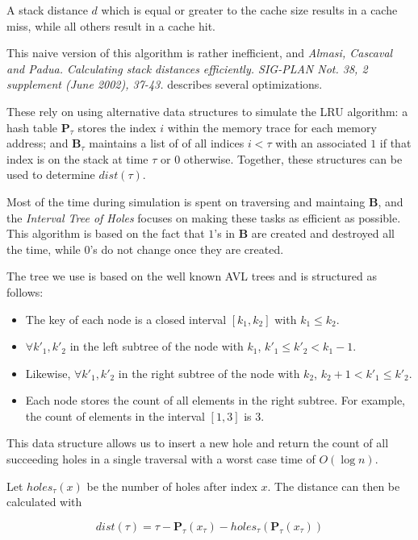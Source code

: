 \documentclass[a4paper,10pt]{article}
\begin{document}
A stack distance $d$ which is equal or greater to the cache size results
in a cache miss, while all others result in a cache hit.

This naive version of this algorithm is rather inefficient, and \emph{Almasi, Cascaval and Padua. Calculating stack distances efficiently. SIG-PLAN Not. 38, 2 supplement (June 2002), 37-43.} describes several optimizations.

These rely on using alternative data structures to simulate the LRU algorithm: a hash table $\mathbf{P}_\tau$ stores the index $i$ within the memory trace for each memory address; and $\mathbf{B}_\tau$ maintains a list of
of all indices $i < \tau$ with an associated $1$ if that index is on the stack at time $\tau$ or $0$ otherwise. Together, these structures can
be used to  determine $dist(\tau)$.

Most of the time during simulation is spent on traversing and maintaing $\mathbf{B}$, and the \emph{Interval Tree of Holes} focuses on making these tasks as efficient as possible. This algorithm is based on the fact that
$1$'s in $\mathbf{B}$ are created and destroyed all the time, while $0$'s
do not change once they are created.

The tree we use is based on the well known AVL trees and is structured
as follows:

\begin{itemize}
\item The key of each node is a closed interval $[k_1, k_2]$ with
      $k_1 \leq k_2$.
\item $\forall k'_1, k'_2$ in the left subtree of the node with $k_1$,          $k'_1 \leq k'_2 < k_1 - 1$.
\item Likewise, $\forall k'_1, k'_2$ in the right subtree of the node with $k_2$, $k_2 + 1 < k'_1 \leq k'_2$.
\item Each node stores the count of all elements
      in the right subtree. For example, the count of elements in the
      interval $[1, 3]$ is $3$.
\end{itemize}

This data structure allows us to insert a new hole and return the count
of all succeeding holes in a single traversal with a worst case
time of $O(\log n)$.

Let $holes_\tau(x)$ be the number of holes after index $x$. The distance
can then be calculated with

\begin{displaymath}
dist(\tau) = \tau - \mathbf{P}_\tau(x_\tau) - holes_\tau(\mathbf{P}_\tau(x_\tau))
\end{displaymath}
\end{document}
